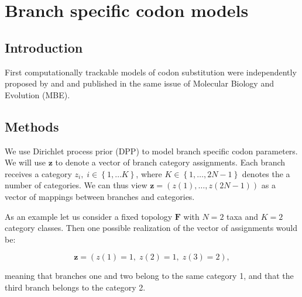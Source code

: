 \chapter{Branch specific codon models}

\section{Introduction}

First computationally trackable models of codon substitution were independently proposed by \cite{Muse1994} and \cite{Goldman1994} and published in the same issue of Molecular Biology and Evolution (MBE).



































\section{Methods}
We use Dirichlet process prior (DPP) to model branch specific codon parameters.
We will use $\mathbf{z}$ to denote a vector of branch category assignments.
Each branch receives a category $z_{i},\; i\in\left\{ 1,\ldots K\right\}$, where $K\in\left\{ 1,\ldots,2N-1\right\}$ denotes the a number of categories.
We can thus view $\mathbf{z}=\left(z(1),\ldots,z(2N-1)\right)$ as a vector of mappings between branches and categories.
 
As an example let us consider a fixed topology $\mathbf{F}$ with $N=2$ taxa and $K=2$ category classes.
Then one possible realization of the vector of assignments would be:

$$\mathbf{z}=\left(z(1)=1,\; z(2)=1,\; z(3)=2\right),$$
 
\noindent
meaning that branches one and two belong to the same category 1, and that the third branch belongs to the category 2.

